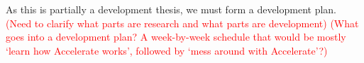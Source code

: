 \documentclass[a4paper,12pt]{article}
\newcommand{\red}[1]{\textcolor{red}{#1}}
\begin{document}
\begin{multicols*}{2}
As this is partially a development thesis, we must form a development plan. 
\red{(Need to clarify what parts are research and what parts are development) (What goes into a development plan? A week-by-week schedule that would be mostly `learn how Accelerate works', followed by `mess around with Accelerate'?)}



\begin{thebibliography}{99}
\end{thebibliography}

\end{multicols*}
\end{document}
